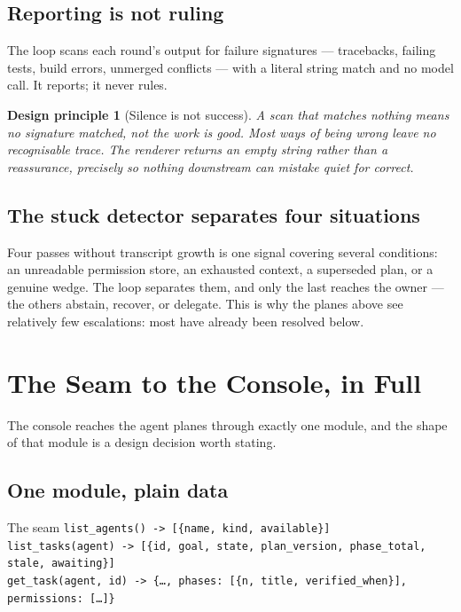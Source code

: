 \documentclass[11pt]{article}
\newtheorem{principle}{Design principle}
\newcommand{\code}[1]{\texttt{\small #1}}
\begin{document}
\subsection{Reporting is not ruling}

The loop scans each round's output for failure signatures --- tracebacks, failing tests, build errors, unmerged conflicts --- with a literal string match and no model call. It reports; it never rules.

\begin{principle}[Silence is not success]
\label{prin:silence}
A scan that matches nothing means \emph{no signature matched}, not \emph{the work is good}. Most ways of being wrong leave no recognisable trace. The renderer returns an empty string rather than a reassurance, precisely so nothing downstream can mistake quiet for correct.
\end{principle}

\subsection{The stuck detector separates four situations}

Four passes without transcript growth is one signal covering several conditions: an unreadable permission store, an exhausted context, a superseded plan, or a genuine wedge. The loop separates them, and only the last reaches the owner --- the others abstain, recover, or delegate. This is why the planes above see relatively few escalations: most have already been resolved below.

\section{The Seam to the Console, in Full}
\label{sec:seam}

The console reaches the agent planes through exactly one module, and the shape of that module is a design decision worth stating.

\subsection{One module, plain data}

\begin{specbox}{The seam}
\code{list\_agents() -> [\{name, kind, available\}]}\\
\code{list\_tasks(agent) -> [\{id, goal, state, plan\_version, phase\_total, stale, awaiting\}]}\\
\code{get\_task(agent, id) -> \{…, phases: [\{n, title, verified\_when\}], permissions: […]\}}
\end{specbox}
\end{document}
